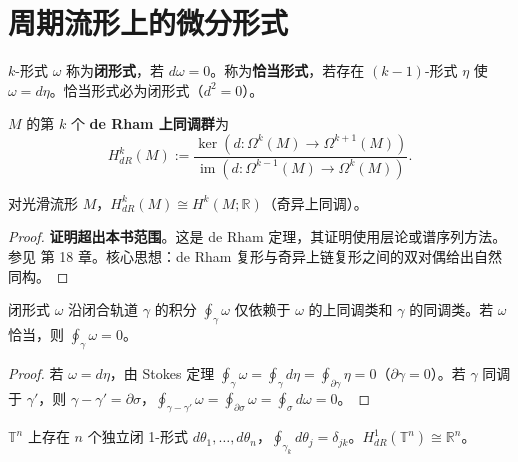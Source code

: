 \section{周期流形上的微分形式}\label{sec:periodic_forms}

\begin{definition}[闭形式与恰当形式]\label{def:closed_exact_forms}
$k$-形式 $\omega$ 称为\textbf{闭形式}，若 $d\omega=0$。称为\textbf{恰当形式}，若存在 $(k-1)$-形式 $\eta$ 使 $\omega=d\eta$。恰当形式必为闭形式（$d^2=0$）。
\end{definition}

\begin{definition}\label{def:de_rham}
$M$ 的第 $k$ 个 \textbf{de Rham 上同调群}为
\[
H^k_{dR}(M):=\frac{\ker(d:\Omega^k(M)\to\Omega^{k+1}(M))}{\operatorname{im}(d:\Omega^{k-1}(M)\to\Omega^k(M))}.
\]
\end{definition}

\begin{theorem}[de Rham 定理]\label{thm:de_rham}
对光滑流形 $M$，$H^k_{dR}(M)\cong H^k(M;\mathbb{R})$（奇异上同调）。
\end{theorem}

\begin{proof}
\textbf{证明超出本书范围}。这是 de Rham 定理，其证明使用层论或谱序列方法。参见 \cite{lee2012smooth} 第 18 章。核心思想：de Rham 复形与奇异上链复形之间的双对偶给出自然同构。
\end{proof}

\begin{proposition}[周期积分与上同调]\label{prop:period_integral}
闭形式 $\omega$ 沿闭合轨道 $\gamma$ 的积分 $\oint_\gamma\omega$ 仅依赖于 $\omega$ 的上同调类和 $\gamma$ 的同调类。若 $\omega$ 恰当，则 $\oint_\gamma\omega=0$。
\end{proposition}

\begin{proof}
若 $\omega=d\eta$，由 Stokes 定理 $\oint_\gamma\omega=\oint_\gamma d\eta=\oint_{\partial\gamma}\eta=0$（$\partial\gamma=0$）。若 $\gamma$ 同调于 $\gamma'$，则 $\gamma-\gamma'=\partial\sigma$，$\oint_{\gamma-\gamma'}\omega=\oint_{\partial\sigma}\omega=\oint_\sigma d\omega=0$。
\end{proof}

\begin{example}[环面上的调和 1-形式]\label{ex:torus_harmonic_forms}
$\mathbb{T}^n$ 上存在 $n$ 个独立闭 1-形式 $d\theta_1,\dots,d\theta_n$，$\oint_{\gamma_k}d\theta_j=\delta_{jk}$。$H^1_{dR}(\mathbb{T}^n)\cong\mathbb{R}^n$。
\end{example}

